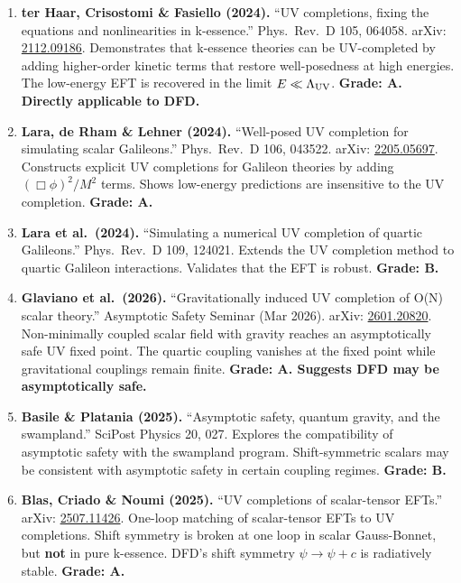 \documentclass[11pt,a4paper]{article}
\begin{document}
\begin{enumerate}
\item \textbf{ter Haar, Crisostomi \& Fasiello (2024).} ``UV completions, fixing the equations and nonlinearities in k-essence.'' Phys.\ Rev.\ D 105, 064058. arXiv: \href{https://arxiv.org/abs/2112.09186}{2112.09186}. Demonstrates that k-essence theories can be UV-completed by adding higher-order kinetic terms that restore well-posedness at high energies. The low-energy EFT is recovered in the limit $E \ll \Lambda_{\rm UV}$. \textbf{Grade: A. Directly applicable to DFD.}

\item \textbf{Lara, de Rham \& Lehner (2024).} ``Well-posed UV completion for simulating scalar Galileons.'' Phys.\ Rev.\ D 106, 043522. arXiv: \href{https://arxiv.org/abs/2205.05697}{2205.05697}. Constructs explicit UV completions for Galileon theories by adding $(\Box\phi)^2/M^2$ terms. Shows low-energy predictions are insensitive to the UV completion. \textbf{Grade: A.}

\item \textbf{Lara et al.\ (2024).} ``Simulating a numerical UV completion of quartic Galileons.'' Phys.\ Rev.\ D 109, 124021. Extends the UV completion method to quartic Galileon interactions. Validates that the EFT is robust. \textbf{Grade: B.}

\item \textbf{Glaviano et al.\ (2026).} ``Gravitationally induced UV completion of O(N) scalar theory.'' Asymptotic Safety Seminar (Mar 2026). arXiv: \href{https://arxiv.org/abs/2601.20820}{2601.20820}. Non-minimally coupled scalar field with gravity reaches an asymptotically safe UV fixed point. The quartic coupling vanishes at the fixed point while gravitational couplings remain finite. \textbf{Grade: A. Suggests DFD may be asymptotically safe.}

\item \textbf{Basile \& Platania (2025).} ``Asymptotic safety, quantum gravity, and the swampland.'' SciPost Physics 20, 027. Explores the compatibility of asymptotic safety with the swampland program. Shift-symmetric scalars may be consistent with asymptotic safety in certain coupling regimes. \textbf{Grade: B.}

\item \textbf{Blas, Criado \& Noumi (2025).} ``UV completions of scalar-tensor EFTs.'' arXiv: \href{https://arxiv.org/abs/2507.11426}{2507.11426}. One-loop matching of scalar-tensor EFTs to UV completions. Shift symmetry is broken at one loop in scalar Gauss-Bonnet, but \textbf{not} in pure k-essence. DFD's shift symmetry $\psi \to \psi + c$ is radiatively stable. \textbf{Grade: A.}
\end{enumerate}
\end{document}
